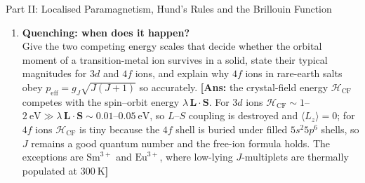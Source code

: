 \documentclass[11pt,a4paper]{article}
\newcommand{\vb}[1]{\mathbf{#1}}
\begin{document}
\begin{assignmentbox}{Part II: Localised Paramagnetism, Hund's Rules and the Brillouin Function}
\begin{enumerate}[label=\textbf{II.\arabic*.}, leftmargin=*]
    \item \textbf{Quenching: when does it happen?}\\
    Give the two competing energy scales that decide whether the orbital moment of a transition-metal ion survives in a solid, state their typical magnitudes for $3d$ and $4f$ ions, and explain why $4f$ ions in rare-earth salts obey $p_{\mathrm{eff}} = g_J\sqrt{J(J+1)}$ so accurately.
    \textbf{[Ans:} the crystal-field energy $\mathcal{H}_{\mathrm{CF}}$ competes with the spin--orbit energy $\lambda\,\vb{L}\cdot\vb{S}$. For $3d$ ions $\mathcal{H}_{\mathrm{CF}} \sim 1$--$2\ \mathrm{eV} \gg \lambda\,\vb{L}\cdot\vb{S} \sim 0.01$--$0.05\ \mathrm{eV}$, so $L$--$S$ coupling is destroyed and $\langle L_z\rangle = 0$; for $4f$ ions $\mathcal{H}_{\mathrm{CF}}$ is tiny because the $4f$ shell is buried under filled $5s^2 5p^6$ shells, so $J$ remains a good quantum number and the free-ion formula holds. The exceptions are $\text{Sm}^{3+}$ and $\text{Eu}^{3+}$, where low-lying $J$-multiplets are thermally populated at $300\ \mathrm{K}$\textbf{]}

\end{enumerate}
\end{assignmentbox}
\end{document}
